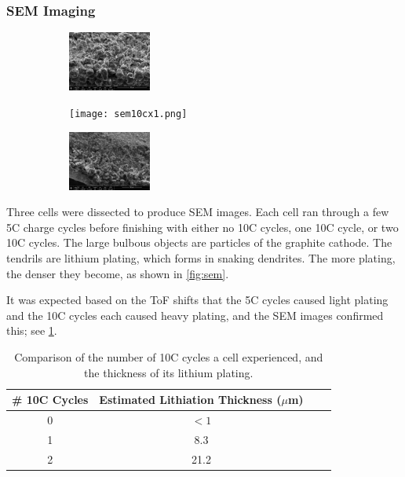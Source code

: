 \subsubsection{SEM Imaging}
\begin{figure}[t!]\label{fig:sem}
\centering
\caption{SEM images of cells after experiencing a few 5C cycles and either zero (left), one (center), or two (right) 10C cycles.}
     \begin{subfigure}
         \centering
         \includegraphics[width=0.3\textwidth]{sem5c.png}
     \end{subfigure}
     \hfill
     \begin{subfigure}
         \centering
         \texttt{[image: sem10cx1.png]}
     \end{subfigure}
     \hfill
     \begin{subfigure}
         \centering
         \includegraphics[width=0.3\textwidth]{sem10cx2.png}
     \end{subfigure}
\end{figure}

Three cells were dissected to produce SEM images. Each cell ran through a few 5C charge cycles before finishing with either no 10C cycles, one 10C cycle, or two 10C cycles. 
The large bulbous objects are particles of the graphite cathode. The tendrils are lithium plating, which forms in snaking dendrites. 
The more plating, the denser they become, as shown in \hyperref[fig:sem]{\cref{fig:sem}}.  

It was expected based on the ToF shifts that the 5C cycles caused light plating and the 10C cycles each caused heavy plating, and the SEM images confirmed this; see \hyperref[tab:plating]{\cref{tab:plating}}. 

\begin{table}[h]
    \centering
    \begin{tabular}{c|c|c|c}
         \# 10C Cycles & Estimated Lithiation Thickness ($\mu$m) \\
         \hline
         0 & $<1$ \\
         1 & 8.3 \\
         2 & 21.2 \\
    \end{tabular}
    \caption{Comparison of the number of 10C cycles a cell experienced, and the thickness of its lithium plating.}
    \label{tab:plating}
\end{table}

